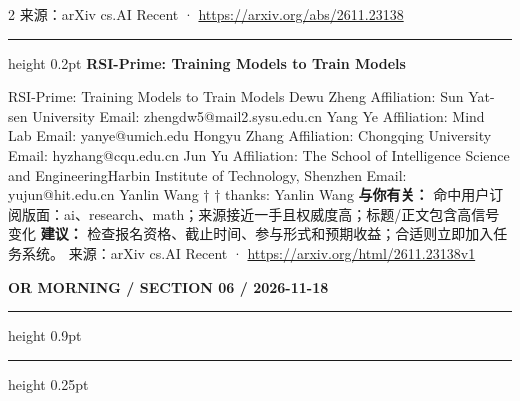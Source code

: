 \documentclass[10.5pt]{ctexart}
\begin{document}
\begin{multicols}{2}
{\footnotesize\color{ormuted} 来源：arXiv cs.AI Recent · \url{https://arxiv.org/abs/2611.23138}}
\vspace{2mm}
\hrule height 0.2pt
\vspace{2mm}
{\large\bfseries RSI-Prime: Training Models to Train Models}\par
RSI-Prime: Training Models to Train Models Dewu Zheng Affiliation: Sun Yat-sen University Email: zhengdw5@mail2.sysu.edu.cn Yang Ye Affiliation: Mind Lab Email: yanye@umich.edu Hongyu Zhang Affiliation: Chongqing University Email: hyzhang@cqu.edu.cn Jun Yu Affiliation: The School of Intelligence Science and EngineeringHarbin Institute of Technology, Shenzhen Email: yujun@hit.edu.cn Yanlin Wang † † thanks: Yanlin Wang
\textbf{与你有关：} 命中用户订阅版面：ai、research、math；来源接近一手且权威度高；标题/正文包含高信号变化
\textbf{建议：} 检查报名资格、截止时间、参与形式和预期收益；合适则立即加入任务系统。
{\footnotesize\color{ormuted} 来源：arXiv cs.AI Recent · \url{https://arxiv.org/html/2611.23138v1}}
\end{multicols}
\newpage
{\small\bfseries OR MORNING / SECTION 06 / 2026-11-18}
\vspace{2mm}
\hrule height 0.9pt
\vspace{1.5mm}
\hrule height 0.25pt
\vspace{4mm}
\end{document}
